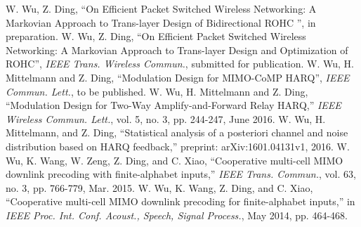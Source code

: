 \documentclass[margin]{res} %
\begin{document}
\begin{resume}
\begin{thebibliography}{}
          \itemsep=4pt
           W. Wu, Z. Ding, ``On Efficient Packet
          Switched Wireless Networking: A Markovian Approach to Trans-layer Design of
          Bidirectional ROHC '', in preparation.
           W. Wu, Z. Ding, ``On Efficient Packet Switched
          Wireless Networking: A Markovian Approach to Trans-layer Design and
          Optimization of ROHC'', \emph{IEEE Trans. Wireless Commun.}, submitted
          for publication.
           W. Wu, H. Mittelmann and Z. Ding,
          ``Modulation Design for MIMO-CoMP HARQ'', \emph{IEEE Commun. Lett.}, to be published.
           W. Wu, H. Mittelmann and Z. Ding, ``Modulation Design for
          Two-Way Amplify-and-Forward Relay HARQ,'' \emph{IEEE Wireless
          Commun. Lett.}, vol. 5, no. 3, pp. 244-247, June 2016.
           W. Wu, H. Mittelmann, and Z. Ding, ``Statistical analysis of a
          posteriori channel and noise distribution based on HARQ feedback,”
          preprint: arXiv:1601.04131v1, 2016.
           W. Wu, K. Wang, W. Zeng, Z. Ding, and C. Xiao,
          ``Cooperative multi-cell MIMO downlink precoding with
          finite-alphabet inputs,'' \emph{IEEE Trans. Commun.}, vol. 63, no.
          3, pp. 766-779, Mar. 2015.
           W. Wu, K. Wang, Z. Ding, and C. Xiao, ``Cooperative multi-cell
          MIMO downlink precoding for finite-alphabet inputs,'' in
          \emph{IEEE Proc. Int. Conf. Acoust., Speech, Signal Process.}, May
          2014, pp. 464-468.
        \end{thebibliography}
        
    \end{resume}
\end{document}
